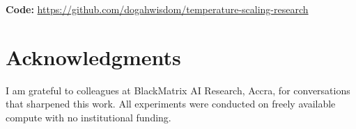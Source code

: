 \documentclass[11pt,a4paper]{article}
\theoremstyle{definition}
\begin{document}
\noindent\textbf{Code:}
\url{https://github.com/dogahwisdom/temperature-scaling-research}

\section*{Acknowledgments}

I am grateful to colleagues at BlackMatrix AI Research, Accra, for
conversations that sharpened this work. All experiments were conducted
on freely available compute with no institutional funding.



\end{document}
